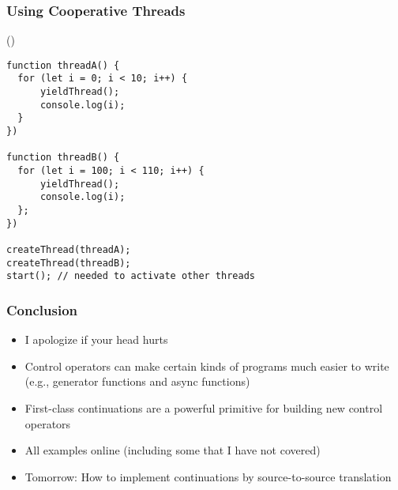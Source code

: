 \documentclass[8pt,pdf]{beamer}
\begin{document}
\begin{frame}[fragile]
\frametitle{Using Cooperative Threads}

()

\begin{lstlisting}
function threadA() {
  for (let i = 0; i < 10; i++) {
      yieldThread();
      console.log(i);
  }
})

function threadB() {
  for (let i = 100; i < 110; i++) {
      yieldThread();
      console.log(i);
  };
})

createThread(threadA);
createThread(threadB);
start(); // needed to activate other threads
\end{lstlisting}
\end{frame}

\begin{frame}
\frametitle{Conclusion}

\begin{itemize}

  \item I apologize if your head hurts

  \item Control operators can make certain kinds of programs much easier to
  write (e.g., generator functions and async functions)

  \item First-class continuations are a powerful primitive for building new
  control operators

  \item All examples online (including some that I have not covered)

  \item Tomorrow: How to implement continuations by source-to-source translation


\end{itemize}

\end{frame}
\end{document}

